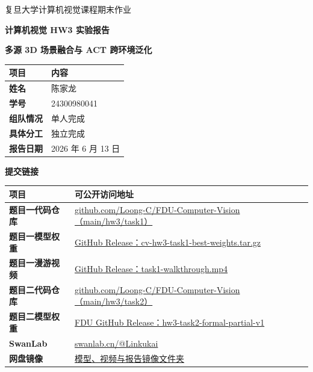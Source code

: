 \documentclass[10pt,a4paper,UTF8,fontset=windows]{ctexart}
\newcommand{\taskoneweights}{https://github.com/Loong-C/FDU-Computer-Vision/releases/download/hw3-task1-weights/cv-hw3-task1-best-weights.tar.gz}
\newcommand{\taskonevideo}{https://github.com/Loong-C/FDU-Computer-Vision/releases/download/hw3-task1-weights/task1-walkthrough.mp4}
\newcommand{\tasktwocode}{https://github.com/Loong-C/FDU-Computer-Vision/tree/main/hw3/task2}
\newcommand{\tasktworelease}{https://github.com/Loong-C/FDU-Computer-Vision/releases/tag/hw3-task2-formal-partial-v1}
\newcommand{\clouddrive}{https://drive.google.com/drive/folders/1v9oc1uTbZS31SaDJaT7sYV8m5dutMo1y?usp=drive_link}
\begin{document}
\sloppy

\begin{titlepage}
  \thispagestyle{empty}
  \centering
  \vspace*{1.4cm}
  {\Large 复旦大学计算机视觉课程期末作业\par}
  \vspace{0.65cm}
  {\fontsize{24}{31}\selectfont\bfseries 计算机视觉 HW3 实验报告\par}
  \vspace{0.35cm}
  {\Large\bfseries 多源 3D 场景融合与 ACT 跨环境泛化\par}
  \vspace{1.05cm}

  \begin{tabularx}{0.88\textwidth}{>{\bfseries}p{3.1cm}Y}
    \toprule
    项目 & 内容 \\
    \midrule
    姓名 & 陈家龙 \\
    学号 & 24300980041 \\
    组队情况 & 单人完成 \\
    具体分工 & 独立完成 \\
    报告日期 & 2026 年 6 月 13 日 \\
    \bottomrule
  \end{tabularx}

  \vspace{0.85cm}
  {\large\bfseries 提交链接\par}
  \vspace{0.25cm}
  \begin{tabularx}{0.94\textwidth}{>{\bfseries}p{3.0cm}Y}
    \toprule
    项目 & 可公开访问地址 \\
    \midrule
    题目一代码仓库 &
    \href{https://github.com/Loong-C/FDU-Computer-Vision/tree/main/hw3/task1}{github.com/Loong-C/FDU-Computer-Vision（main/hw3/task1）} \\
    题目一模型权重 &
    \href{\taskoneweights}{GitHub Release：cv-hw3-task1-best-weights.tar.gz} \\
    题目一漫游视频 &
    \href{\taskonevideo}{GitHub Release：task1-walkthrough.mp4} \\
    题目二代码仓库 &
    \href{\tasktwocode}{github.com/Loong-C/FDU-Computer-Vision（main/hw3/task2）} \\
    题目二模型权重 &
    \href{\tasktworelease}{FDU GitHub Release：hw3-task2-formal-partial-v1} \\
    SwanLab &
    \href{https://swanlab.cn/@Linkukai}{swanlab.cn/@Linkukai} \\
    网盘镜像 &
    \href{\clouddrive}{模型、视频与报告镜像文件夹} \\
    \bottomrule
  \end{tabularx}

  \vfill
  \vspace{0.7cm}
\end{titlepage}
\end{document}
